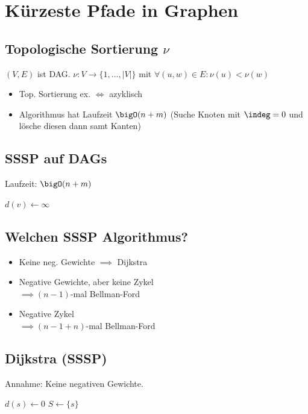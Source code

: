 \section*{Kürzeste Pfade in Graphen}

\subsection*{Topologische Sortierung $\nu$}
$(V,E)$ ist DAG. $\nu: V \to \{1,\ldots,|V|\}$ mit
$\forall (u,w)\in E: \nu(u) < \nu(w)$

\begin{itemize}
	\item Top. Sortierung ex. $\iff$ azyklisch
	\item Algorithmus hat Laufzeit $\bigO(n+m)$
		(Suche Knoten mit $\indeg=0$ und lösche diesen dann samt Kanten)
\end{itemize}

\subsection*{SSSP auf DAGs}
Laufzeit: $\bigO(n+m)$

\begin{algorithm}[H]
	 {
		$d(v) \gets \infty$\;
		
	}
\end{algorithm}

\subsection*{Welchen SSSP Algorithmus?}
\begin{itemize}
	\item Keine neg. Gewichte $\implies$ Dijkstra
	\item Negative Gewichte, aber keine Zykel\\ $\implies (n-1)$-mal Bellman-Ford
	\item Negative Zykel\\ $\implies (n-1+n)$-mal Bellman-Ford
\end{itemize}

\subsection*{Dijkstra (SSSP)}
Annahme: Keine negativen Gewichte.
\begin{algorithm}[H]
	$d(s) \gets 0$\;
	$S \gets \{s\}$\;
\end{algorithm}

